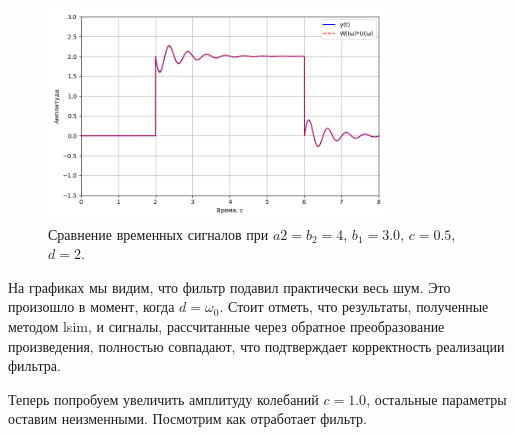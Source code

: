 \documentclass[a4paper]{article}
\begin{document}
\begin{figure}[H]
  \centering
  \includegraphics[width=0.8\textwidth]{src/task_1_2/5. time_comp_157_3_0.5.png}
  \caption{Сравнение временных сигналов при $a2 = b_2 = 4$, $b_1=3.0$, $c=0.5$, $d=2$.}
\end{figure}

\noindent На графиках мы видим, что фильтр подавил практически весь шум. Это произошло в момент, когда $d=\omega_0$. Стоит отметь, что результаты, полученные методом lsim, и сигналы, рассчитанные через обратное преобразование произведения, полностью совпадают, что подтверждает корректность реализации фильтра.

Теперь попробуем увеличить амплитуду колебаний $c=1.0$, остальные параметры оставим неизменными. Посмотрим как отработает фильтр.
\end{document}
